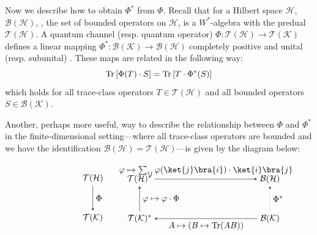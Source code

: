 Now we describe how to obtain  $\Phi^*$ from $\Phi$. 
Recall that for a Hilbert space \( \mathcal{H} \), \( \mathcal{B}(\mathcal{H}) \), \ie, the set of bounded operators on \( \mathcal{H} \), is a \( W^* \)-algebra with the predual \( \mathcal{T}(\mathcal{H}) \).
A quantum channel (resp. quantum operator) $\Phi: \mathcal{T}(\mathcal{H})  \to \mathcal{T}(\mathcal{K})$ defines a linear mapping 
$\Phi^*: \mathcal{B}(\mathcal{K}) \to \mathcal{B}(\mathcal{H})$ completely positive and unital (resp. subunital) \cite[Proposition 5.1,]{choSemanticsQuantumProgramming2016}. These maps are related in the following way:
\begin{equation*}
\text{Tr}\left[\Phi(T) \cdot S\right] = \text{Tr} \left[T \cdot \Phi^*(S)\right]
\end{equation*}
which holds for all trace-class operators $T \in \mathcal{T}(\mathcal{H})$ and all bounded operators $S \in \mathcal{B}(\mathcal{K})$.

Another, perhaps more useful, way to describe the relationship between $\Phi$ and $\Phi^*$ in the finite-dimensional setting---where all trace-class operators are bounded and we have the identification \( \mathcal{B}(\mathcal{H}) = \mathcal{T}(\mathcal{H}) \)---is given by the diagram below:

\[
\hspace{-50pt}
\begin{minipage}{0.45\textwidth}
\centering
\begin{tikzpicture}
  \matrix (m) [matrix of math nodes,row sep=3em,column sep=2em,minimum width=1em]
  { 
    \mathcal{T}(\mathcal{H}) \\
     \mathcal{T}(\mathcal{K})  \\
  };
  \path[-stealth]
    (m-1-1) edge  node [right] {$\Phi$} (m-2-1);
\end{tikzpicture}
\end{minipage}
\hspace{-50pt}
\begin{minipage}{0.45\textwidth}
\centering
\begin{tikzpicture}
  \matrix (m) [matrix of math nodes,row sep=3em,column sep=12em,minimum width=1em]
  {
  \mathcal{T}(\mathcal{H})^*&  \mathcal{B}(\mathcal{H})  \\
   \mathcal{T}(\mathcal{K})^* &  \mathcal{B}(\mathcal{K}) \\
  };
  \path[-stealth]
    (m-1-1) edge  node [above] {$\varphi \mapsto \sum_{ij} \varphi(\ket{j}\bra{i}) \cdot \ket{i} \bra{j}  $} (m-1-2)
    (m-2-2) edge [dotted]  node [right] {$\Phi^*$} (m-1-2)
    (m-2-2) edge  node [below] {$ A \mapsto (B \mapsto \tr(AB)) $} (m-2-1)
    (m-2-1) edge  node [right] {$ \varphi \mapsto \varphi \cdot \Phi $} (m-1-1)
    ;
\end{tikzpicture}
\end{minipage}
\]


